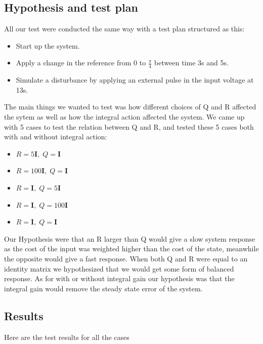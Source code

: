 \subsection{Hypothesis and test plan}
All our test were conducted the same way with a test plan structured as this: 
\begin{itemize}
	\item Start up the system.
	\item Apply a change in the reference from 0 to $\frac{\pi}{4}$ between time 3s and 5s. 
	\item Simulate a disturbance by applying an external pulse in the input voltage at 13s.
\end{itemize}
The main things we wanted to test was how different choices of Q and R affected the sytem as well as how the integral action affected the system. 
We came up with 5 cases to test the relation between Q and R, and tested these 5 cases both with and without integral action:
\begin{itemize}
	\item $R = 5\mathbf{I},\; Q=\mathbf{I}$
	\item $R = 100\mathbf{I},\; Q=\mathbf{I}$
	\item $R = \mathbf{I},\; Q=5\mathbf{I}$
	\item $R = \mathbf{I},\; Q=100\mathbf{I}$
	\item $R = \mathbf{I},\; Q=\mathbf{I}$
\end{itemize}
Our Hypothesis were that an R larger than Q would give a slow system response as the cost of the input was weighted higher than the cost of the state, meanwhile the opposite would give a fast response. 
When both Q and R were equal to an identity matrix we hypothesized that we would get some form of balanced response. 
As for with or without integral gain our hypothesis was that the integral gain would remove the steady state error of the system.

\subsection{Results}
Here are the test results for all the cases
